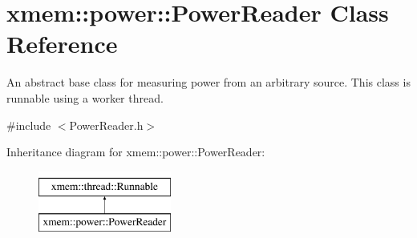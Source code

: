 \hypertarget{classxmem_1_1power_1_1_power_reader}{}\section{xmem\+:\+:power\+:\+:Power\+Reader Class Reference}
\label{classxmem_1_1power_1_1_power_reader}


An abstract base class for measuring power from an arbitrary source. This class is runnable using a worker thread.  




{\ttfamily \#include $<$Power\+Reader.\+h$>$}

Inheritance diagram for xmem\+:\+:power\+:\+:Power\+Reader\+:\begin{figure}[H]
\begin{center}
\leavevmode
\includegraphics[height=2.000000cm]{classxmem_1_1power_1_1_power_reader}
\end{center}
\end{figure}
